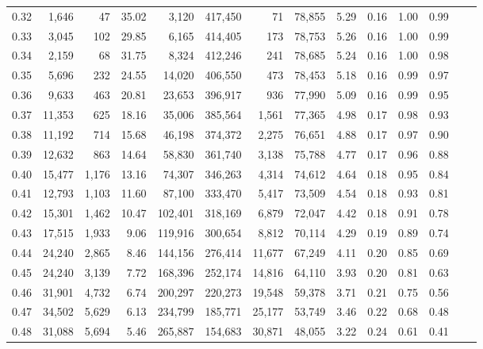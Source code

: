 \begin{tabular}{rrrrrrrrrrrrrr}
0.32 &   1,646 &     47 &   35.02 &    3,120 &  417,450 &      71 &  78,855 &  5.29 &  0.16 &  1.00 &      0.99 \\
0.33 &   3,045 &    102 &   29.85 &    6,165 &  414,405 &     173 &  78,753 &  5.26 &  0.16 &  1.00 &      0.99 \\
0.34 &   2,159 &     68 &   31.75 &    8,324 &  412,246 &     241 &  78,685 &  5.24 &  0.16 &  1.00 &      0.98 \\
0.35 &   5,696 &    232 &   24.55 &   14,020 &  406,550 &     473 &  78,453 &  5.18 &  0.16 &  0.99 &      0.97 \\
0.36 &   9,633 &    463 &   20.81 &   23,653 &  396,917 &     936 &  77,990 &  5.09 &  0.16 &  0.99 &      0.95 \\
0.37 &  11,353 &    625 &   18.16 &   35,006 &  385,564 &   1,561 &  77,365 &  4.98 &  0.17 &  0.98 &      0.93 \\
0.38 &  11,192 &    714 &   15.68 &   46,198 &  374,372 &   2,275 &  76,651 &  4.88 &  0.17 &  0.97 &      0.90 \\
0.39 &  12,632 &    863 &   14.64 &   58,830 &  361,740 &   3,138 &  75,788 &  4.77 &  0.17 &  0.96 &      0.88 \\
0.40 &  15,477 &  1,176 &   13.16 &   74,307 &  346,263 &   4,314 &  74,612 &  4.64 &  0.18 &  0.95 &      0.84 \\
0.41 &  12,793 &  1,103 &   11.60 &   87,100 &  333,470 &   5,417 &  73,509 &  4.54 &  0.18 &  0.93 &      0.81 \\
0.42 &  15,301 &  1,462 &   10.47 &  102,401 &  318,169 &   6,879 &  72,047 &  4.42 &  0.18 &  0.91 &      0.78 \\
0.43 &  17,515 &  1,933 &    9.06 &  119,916 &  300,654 &   8,812 &  70,114 &  4.29 &  0.19 &  0.89 &      0.74 \\
0.44 &  24,240 &  2,865 &    8.46 &  144,156 &  276,414 &  11,677 &  67,249 &  4.11 &  0.20 &  0.85 &      0.69 \\
0.45 &  24,240 &  3,139 &    7.72 &  168,396 &  252,174 &  14,816 &  64,110 &  3.93 &  0.20 &  0.81 &      0.63 \\
0.46 &  31,901 &  4,732 &    6.74 &  200,297 &  220,273 &  19,548 &  59,378 &  3.71 &  0.21 &  0.75 &      0.56 \\
0.47 &  34,502 &  5,629 &    6.13 &  234,799 &  185,771 &  25,177 &  53,749 &  3.46 &  0.22 &  0.68 &      0.48 \\
0.48 &  31,088 &  5,694 &    5.46 &  265,887 &  154,683 &  30,871 &  48,055 &  3.22 &  0.24 &  0.61 &      0.41 \\

\end{tabular}

